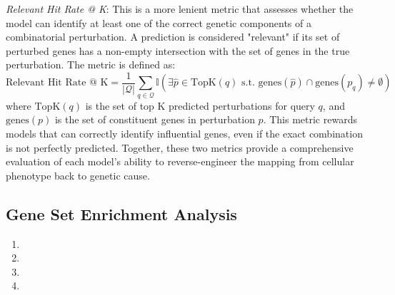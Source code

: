 \emph{Relevant Hit Rate @ K}: This is a more lenient metric that assesses whether the model can identify at least one of the correct genetic components of a combinatorial perturbation.
A prediction is considered "relevant" if its set of perturbed genes has a non-empty intersection with the set of genes in the true perturbation.
The metric is defined as:
\begin{equation}
    \text{Relevant Hit Rate @ K} = \frac{1}{|\mathcal{Q}|} \sum_{q \in \mathcal{Q}} \mathbb{I}(\exists \hat{p} \in \text{TopK}(q) \text{ s.t. } \text{genes}(\hat{p}) \cap \text{genes}(p_q) \neq \emptyset)
    \label{eq:app:relevant_hitrate}
\end{equation}
where $\text{TopK}(q)$ is the set of top K predicted perturbations for query $q$, and $\text{genes}(p)$ is the set of constituent genes in perturbation $p$.
This metric rewards models that can correctly identify influential genes, even if the exact combination is not perfectly predicted.
Together, these two metrics provide a comprehensive evaluation of each model's ability to reverse-engineer the mapping from cellular phenotype back to genetic cause.

\subsection{Gene Set Enrichment Analysis}
\label{app:metrics:gsea_setup}

\begin{enumerate}
    \item {}
    \item {}
    \item {}
    \item {}
\end{enumerate}

